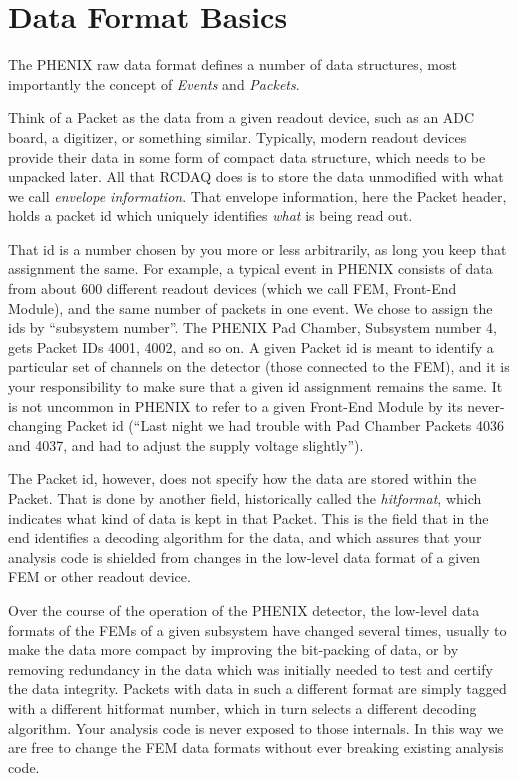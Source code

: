 \documentclass{article}[11pt]
\begin{document}
\section{Data Format Basics}

The PHENIX raw data format defines a number of data structures, most
importantly the concept of \emph{Events} and \emph{Packets}.

Think of a Packet as the data from a given readout device, such as an
ADC board, a digitizer, or something similar. Typically, modern
readout devices provide their data in some form of compact data
structure, which needs to be unpacked later. All that RCDAQ does is to
store the data unmodified with what we call \emph{envelope
  information}. That envelope information, here the Packet header,
holds a packet id which uniquely identifies \emph{what} is being read
out.

That id is a number chosen by you more or less arbitrarily, as long 
you keep that assignment the same. For example, a typical event in
PHENIX consists of data from about 600 different readout devices
(which we call FEM, Front-End Module), and the same number of packets
in one event. We chose to assign the ids by ``subsystem number''.  The
PHENIX Pad Chamber, Subsystem number 4, gets Packet IDs 4001, 4002,
and so on. A given Packet id is meant to identify a particular set of
channels on the detector (those connected to the FEM), and it is your
responsibility to make sure that a given id assignment remains the
same. It is not uncommon in PHENIX to refer to a given Front-End
Module by its never-changing Packet id (``Last night we had trouble
with Pad Chamber Packets 4036 and 4037, and had to adjust the supply
voltage slightly'').

The Packet id, however, does not specify how the data are stored
within the Packet. That is done by another field, historically called
the \emph{hitformat}, which indicates what kind of data is kept in
that Packet. This is the field that in the end identifies a decoding
algorithm for the data, and which assures that your analysis code is
shielded from changes in the low-level data format of a given FEM or other
readout device. 

Over the course of the operation of the PHENIX detector, the low-level
data formats of the FEMs of a given subsystem have changed several
times, usually to make the data more compact by improving the
bit-packing of data, or by removing redundancy in the data which was
initially needed to test and certify the data integrity. Packets with
data in such a different format are simply tagged with a different
hitformat number, which in turn selects a different decoding
algorithm. Your analysis code is never exposed to those internals. In
this way we are free to change the FEM data formats without ever
breaking existing analysis code.
\end{document}
